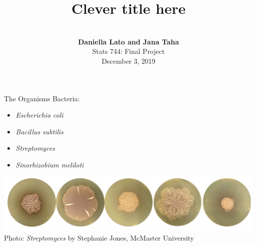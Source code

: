 \documentclass{beamer}
\title{\Huge Clever title here}
\author[Daniella Lato]{\\ \textbf{Daniella Lato and Jana Taha}\\ Stats 744: Final Project\\ December 3, 2019}
\date[2017]{}
\makeatletter
\newcommand{\bi}{\begin{itemize}}
\newcommand{\ei}{\end{itemize}}
\newcommand{\itm}{\item<itm@1->}
\newcommand{\sm}{\textit{Sinorhizobium meliloti}\xspace}
\newcommand{\ecoli}{\textit{Escherichia coli}\xspace}
\newcommand{\bas}{\textit{Bacillus subtilis}\xspace}
\newcommand{\strep}{\textit{Streptomyces}\xspace}
\makeatother
\begin{document}
	\begin{frame}
		
		\titlepage
		
	\end{frame}
	
	
\begin{frame}{The Organisms}
	Bacteria:
	\bi
	\itm \ecoli
	\itm \bas
	\itm \strep
	\itm \sm
	\ei
	\vfill
	
	\includegraphics[width=\textwidth]{strep_pic}
%		
\centering
		{\centering \tiny Photo: \strep by Stephanie Jones, McMaster University}
\end{frame}
\end{document}
